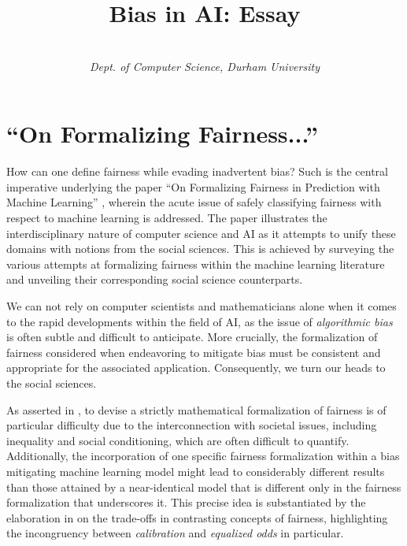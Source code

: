 \documentclass[a4paper]{IEEEtran}
\begin{document}
\title{\vspace{-0.3em}Bias in AI: Essay\vspace{-0.3em}}
\author{\\ \textit{Dept. of Computer Science, Durham University}\vspace{-2.2em}}
\maketitle

\section{``On Formalizing Fairness...''}

How can one define fairness while evading inadvertent bias? Such is the central imperative underlying the paper ``On Formalizing Fairness in Prediction with Machine Learning'' \cite{b1}, wherein the acute issue of safely classifying fairness with respect to machine learning is addressed. The paper illustrates the interdisciplinary nature of computer science and AI as it attempts to unify these domains with notions from the social sciences. This is achieved by surveying the various attempts at formalizing fairness within the machine learning literature and unveiling their corresponding social science counterparts. 

We can not rely on computer scientists and mathematicians alone when it comes to the rapid developments within the field of AI, as the issue of \textit{algorithmic bias} is often subtle and difficult to anticipate. More crucially, the formalization of fairness considered when endeavoring to mitigate bias must be consistent and appropriate for the associated application. Consequently, we turn our heads to the social sciences. %

As asserted in \cite{b1}, to devise a strictly mathematical formalization of fairness is of particular difficulty due to the interconnection with societal issues, including inequality and social conditioning, which are often difficult to quantify. Additionally, the incorporation of one specific fairness formalization within a bias mitigating machine learning model might lead to considerably different results than those attained by a near-identical model that is different only in the fairness formalization that underscores it. This precise idea is substantiated by the elaboration in \cite{trade-offs} on the trade-offs in contrasting concepts of fairness, highlighting the incongruency between \textit{calibration} and \textit{equalized odds} in particular. %
\end{document}
